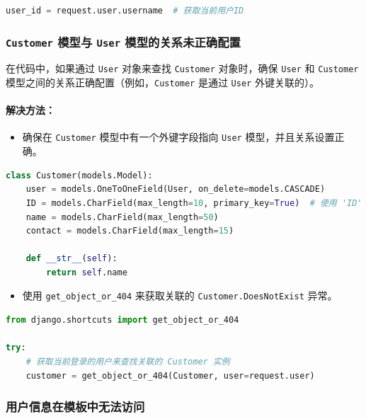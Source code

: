 \documentclass[UTF8,a4paper,12pt]{ctexart}
\begin{document}
\begin{lstlisting}[language=Python]
    user_id = request.user.username  # 获取当前用户ID
\end{lstlisting}

\subsubsection{\texttt{Customer} 模型与 \texttt{User} 模型的关系未正确配置}

在代码中，如果通过 \texttt{User} 对象来查找 \texttt{Customer} 对象时，确保 \texttt{User} 和 \texttt{Customer} 模型之间的关系正确配置（例如，\texttt{Customer} 是通过 \texttt{User} 外键关联的）。

\paragraph{解决方法：}
\begin{itemize}
    \item 确保在 \texttt{Customer} 模型中有一个外键字段指向 \texttt{User} 模型，并且关系设置正确。
\end{itemize}

\begin{lstlisting}[language=Python]
    class Customer(models.Model):
    user = models.OneToOneField(User, on_delete=models.CASCADE)
    ID = models.CharField(max_length=10, primary_key=True)  # 使用 'ID' 作为主键
    name = models.CharField(max_length=50)
    contact = models.CharField(max_length=15)

    def __str__(self):
        return self.name
\end{lstlisting}

\begin{itemize}
    \item 使用 \verb|get_object_or_404| 来获取关联的 \verb|Customer.DoesNotExist| 异常。
\end{itemize}



\begin{lstlisting}[language=Python]
from django.shortcuts import get_object_or_404  

try:
    # 获取当前登录的用户来查找关联的 Customer 实例
    customer = get_object_or_404(Customer, user=request.user)
\end{lstlisting}

\subsubsection{用户信息在模板中无法访问}
\end{document}
